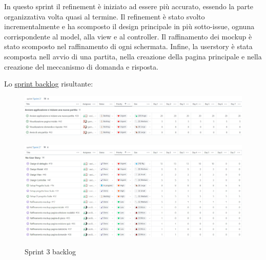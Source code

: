 In questo sprint il refinement è iniziato ad essere più accurato, essendo la parte organizzativa volta quasi al termine. Il refinement è stato svolto incrementalmente e ha scomposto il design principale in più sotto-issue, ognuna corrispondente al model, alla view e al controller. Il raffinamento dei mockup è stato scomposto nel raffinamento di ogni schermata.  Infine, la userstory è stata scomposta nell avvio di una partita, nella creazione della pagina principale e nella creazione del meccanismo di domanda e risposta. 

Lo \href{https://github.com/orgs/ISIQuiz/projects/3/}{sprint backlog} risultante:

\begin{figure}[H]
    \centering
    \includegraphics[width=\textwidth]{process/Img/Sprint3BL1.jpg}
    \label{fig:Sprint3BL1}
\end{figure}
\begin{figure}[H]
    \centering
    \includegraphics[width=\textwidth]{process/Img/Sprint3BL2.jpg}
    \label{fig:Sprint3BL2}
    \caption{Sprint 3 backlog}
\end{figure}
